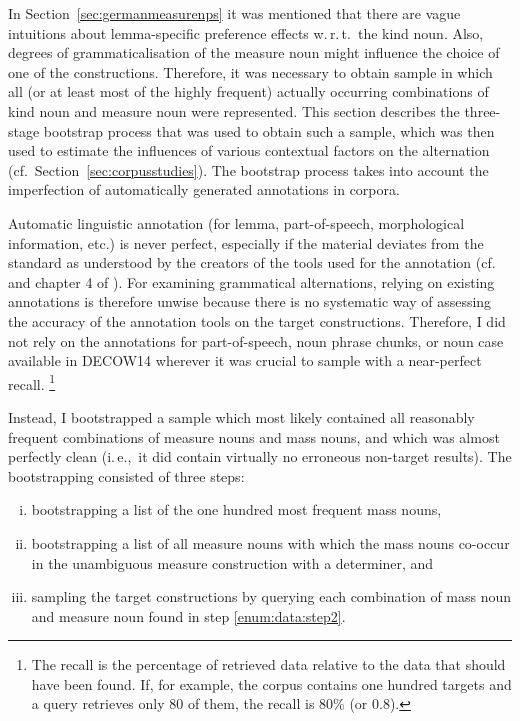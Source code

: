 \documentclass[USenglish]{article}
\newcommand{\ie}{i.\,e.,}
\begin{document}
In Section~\ref{sec:germanmeasurenps} it was mentioned that there are vague intuitions about lemma-specific preference effects w.\,r.\,t.\ the kind noun.
Also, degrees of grammaticalisation of the measure noun might influence the choice of one of the constructions.
Therefore, it was necessary to obtain sample in which all (or at least most of the highly frequent) actually occurring combinations of kind noun and measure noun were represented.
This section describes the three-stage bootstrap process that was used to obtain such a sample, which was then used to estimate the influences of various contextual factors on the alternation (cf.\ Section~\ref{sec:corpusstudies}).
The bootstrap process takes into account the imperfection of automatically generated annotations in corpora.

Automatic linguistic annotation (for lemma, part-of-speech, morphological information, etc.) is never perfect, especially if the material deviates from the standard as understood by the creators of the tools used for the annotation (cf. \citealp{BeisswengerEa2016,GiesbrechtEvert2009} and chapter 4 of \citealp{SchaeferBildhauer2013}).
For examining grammatical alternations, relying on existing annotations is therefore unwise because there is no systematic way of assessing the accuracy of the annotation tools on the target constructions.
Therefore, I did not rely on the annotations for part-of-speech, noun phrase chunks, or noun case available in DECOW14 wherever it was crucial to sample with a near-perfect recall.%
\footnote{The recall is the percentage of retrieved data relative to the data that should have been found.
If, for example, the corpus contains one hundred targets and a query retrieves only 80 of them, the recall is 80\% (or 0.8).}

Instead, I bootstrapped a sample which most likely contained all reasonably frequent combinations of measure nouns and mass nouns, and which was almost perfectly clean (\ie\ it did contain virtually no erroneous non-target results).
The bootstrapping consisted of three steps:\\

\begin{enumerate}[i.]
  \item\label{enum:data:step1} bootstrapping a list of the one hundred most frequent mass nouns,
  \item\label{enum:data:step2} bootstrapping a list of all measure nouns with which the mass nouns co-occur in the unambiguous measure construction with a determiner, and
  \item\label{enum:data:step3} sampling the target constructions by querying each combination of mass noun and measure noun found in step \ref{enum:data:step2}.
\end{enumerate}
\end{document}
